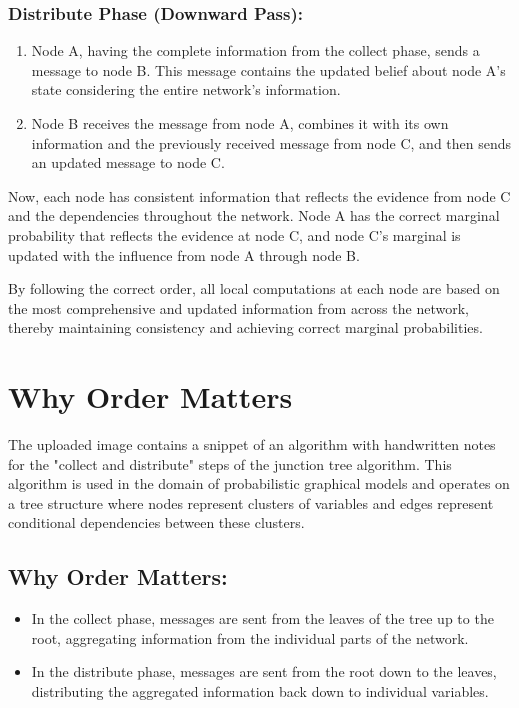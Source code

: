 \documentclass{article}
\begin{document}
\subsubsection*{Distribute Phase (Downward Pass):}
\begin{enumerate}
    \item Node A, having the complete information from the collect phase, sends a message to node B. This message contains the updated belief about node A’s state considering the entire network's information.
    \item Node B receives the message from node A, combines it with its own information and the previously received message from node C, and then sends an updated message to node C.
\end{enumerate}

Now, each node has consistent information that reflects the evidence from node C and the dependencies throughout the network. Node A has the correct marginal probability that reflects the evidence at node C, and node C’s marginal is updated with the influence from node A through node B.

By following the correct order, all local computations at each node are based on the most comprehensive and updated information from across the network, thereby maintaining consistency and achieving correct marginal probabilities.

\section*{Why Order Matters}
The uploaded image contains a snippet of an algorithm with handwritten notes for the "collect and distribute" steps of the junction tree algorithm. This algorithm is used in the domain of probabilistic graphical models and operates on a tree structure where nodes represent clusters of variables and edges represent conditional dependencies between these clusters.

\subsection*{Why Order Matters:}
\begin{itemize}
    \item In the collect phase, messages are sent from the leaves of the tree up to the root, aggregating information from the individual parts of the network.
    \item In the distribute phase, messages are sent from the root down to the leaves, distributing the aggregated information back down to individual variables.
\end{itemize}
\end{document}
